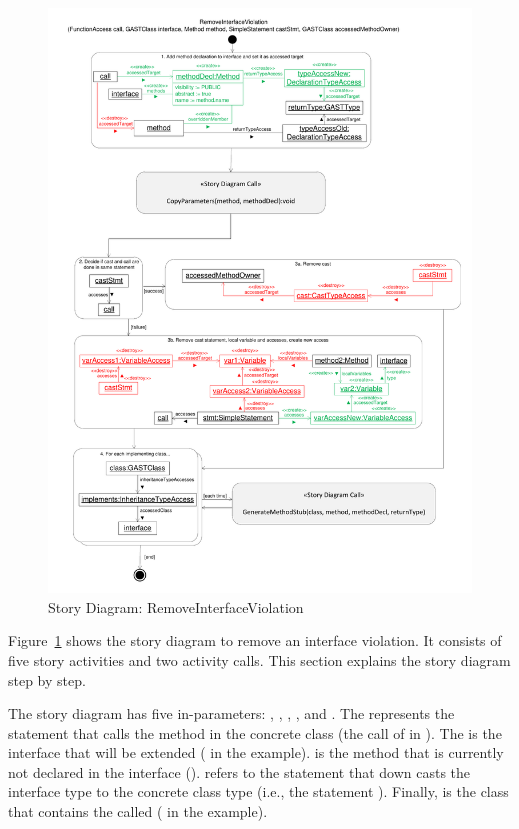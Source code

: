 \begin{figure}[hbtp]
\centering
\includegraphics[width=\linewidth]{./figures/SDRemoveInterfaceViolation}
\caption{Story Diagram: RemoveInterfaceViolation}
\label{fig:SDRemoveInterfaceViolation}
\end{figure}

Figure~\ref{fig:SDRemoveInterfaceViolation} shows the story diagram to remove an interface violation. It consists of five story activities and two activity calls. This section explains the story diagram step by step.

The story diagram has five in-parameters: , , , , and . The  represents the statement that calls the method in the concrete class (the call of  in ). The  is the interface that will be extended ( in the example).  is the method that is currently not declared in the interface ().  refers to the statement that down casts the interface type to the concrete class type (i.e., the statement ). Finally,  is the class that contains the called  ( in the example).

